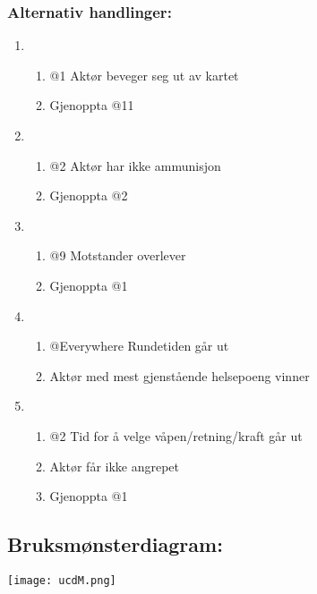 \documentclass[12pt]{report}
\begin{document}
\subsubsection*{Alternativ handlinger:}

\begin{enumerate}[label=\Alph*]
\item 
\bigskip

\begin{enumerate}
\item @1 Akt{\o}r beveger seg ut av kartet 
\item Gjenoppta @11 
\end{enumerate}
\item 
\bigskip

\begin{enumerate}
\item @2 Akt{\o}r har ikke ammunisjon 
\item Gjenoppta @2 
\end{enumerate}
\item 
\bigskip

\begin{enumerate}
\item @9 Motstander overlever 
\item Gjenoppta @1 
\end{enumerate}
\item 
\bigskip

\begin{enumerate}
\item @Everywhere Rundetiden g{\aa}r ut 
\item Akt{\o}r med mest gjenst{\aa}ende helsepoeng vinner
\end{enumerate}
\item 
\bigskip

\begin{enumerate}
\item @2 Tid for {\aa} velge v{\aa}pen/retning/kraft g{\aa}r ut 
\item Akt{\o}r f{\aa}r ikke angrepet 
\item Gjenoppta @1
\end{enumerate}
\end{enumerate}

\subsection*{Bruksm{\o}nsterdiagram:}

\texttt{[image: ucdM.png]}
\end{document}
